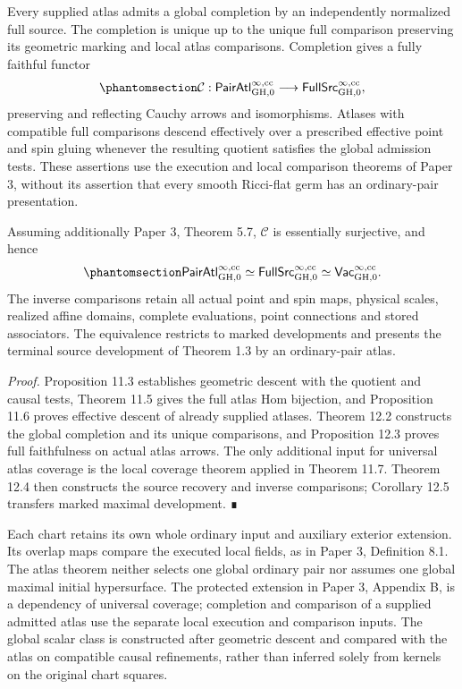 \documentclass[
  english,
  11pt,
  reqno]{amsart}
\begin{document}
Every supplied atlas admits a global completion by an independently
normalized full source. The completion is unique up to the unique full
comparison preserving its geometric marking and local atlas comparisons.
Completion gives a fully faithful functor
\begin{equation}\protect\phantomsection\label{eq:ordinary-atlas-completion-overview}{
\mathcal C:
\mathsf{PairAtl}^{\infty,\mathrm{cc}}_{\mathrm{GH},0}
\longrightarrow
\mathsf{FullSrc}^{\infty,\mathrm{cc}}_{\mathrm{GH},0},
}\end{equation} preserving and reflecting Cauchy arrows and
isomorphisms. Atlases with compatible full comparisons descend
effectively over a prescribed effective point and spin gluing whenever
the resulting quotient satisfies the global admission tests. These
assertions use the execution and local comparison theorems of Paper 3,
without its assertion that every smooth Ricci-flat germ has an
ordinary-pair presentation.

Assuming additionally Paper 3, Theorem 5.7, \(\mathcal C\) is
essentially surjective, and hence
\begin{equation}\protect\phantomsection\label{eq:ordinary-atlas-three-categories-overview}{
\mathsf{PairAtl}^{\infty,\mathrm{cc}}_{\mathrm{GH},0}
\simeq
\mathsf{FullSrc}^{\infty,\mathrm{cc}}_{\mathrm{GH},0}
\simeq
\mathsf{Vac}^{\infty,\mathrm{cc}}_{\mathrm{GH},0}.
}\end{equation} The inverse comparisons retain all actual point and spin
maps, physical scales, realized affine domains, complete evaluations,
point connections and stored associators. The equivalence restricts to
marked developments and presents the terminal source development of
Theorem 1.3 by an ordinary-pair atlas.

\emph{Proof.} Proposition 11.3 establishes geometric descent with the
quotient and causal tests, Theorem 11.5 gives the full atlas Hom
bijection, and Proposition 11.6 proves effective descent of already
supplied atlases. Theorem 12.2 constructs the global completion and its
unique comparisons, and Proposition 12.3 proves full faithfulness on
actual atlas arrows. The only additional input for universal atlas
coverage is the local coverage theorem applied in Theorem 11.7. Theorem
12.4 then constructs the source recovery and inverse comparisons;
Corollary 12.5 transfers marked maximal development. ∎

Each chart retains its own whole ordinary input and auxiliary exterior
extension. Its overlap maps compare the executed local fields, as in
Paper 3, Definition 8.1. The atlas theorem neither selects one global
ordinary pair nor assumes one global maximal initial hypersurface. The
protected extension in Paper 3, Appendix B, is a dependency of universal
coverage; completion and comparison of a supplied admitted atlas use the
separate local execution and comparison inputs. The global scalar class
is constructed after geometric descent and compared with the atlas on
compatible causal refinements, rather than inferred solely from kernels
on the original chart squares.
\end{document}
